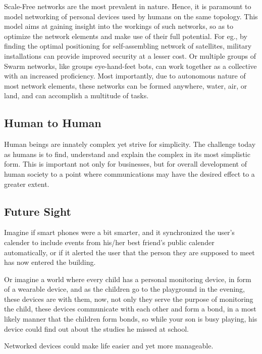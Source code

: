 Scale-Free networks are the most prevalent in nature. Hence, it is paramount to model networking of personal devices used by humans on the same topology. 
This model aims at gaining insight into the workings of such networks, so as to optimize the network elements and make use of their full potential. For eg., by finding the optimal positioning for self-assembling network of satellites, military installations can provide improved security at a lesser cost. Or multiple groups of Swarm networks, like groups eye-hand-feet bots, can work together as a collective with an increased proficiency.  Most importantly, due to autonomous nature of most network elements, these networks can be formed anywhere, water, air, or land, and can accomplish a multitude of tasks.

\subsection{Human to Human}
Human beings are innately complex yet strive for simplicity. The challenge today as humans is to find, understand and explain the complex in its most simplistic form. This is important not only for businesses, but for overall development of human society to a point where communications may have the desired effect to a greater extent.


\subsection{Future Sight}

Imagine if smart phones were a bit smarter, and it synchronized the user's calender to include events from his/her best friend's public calender automatically, or if it alerted the user that the person they are supposed to meet has now entered the building.

Or imagine a world where every child has a personal monitoring device, in form of a wearable device, and as the children go to the playground in the evening, these devices are with them, now, not only they serve the purpose of monitoring the child, these devices communicate with each other and form a bond, in a most likely manner that the children form bonds, so while your son is busy playing, his device could find out about the studies he missed at school.

Networked devices could make life easier and yet more manageable.



